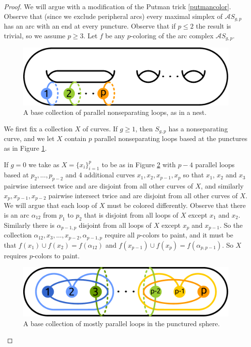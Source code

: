 \begin{proof}
  We will argue with a modification of the Putman trick \ref{putmancolor}.
  Observe that (since we exclude peripheral arcs)
  every maximal simplex of $\mathcal A S_{g,p}$
  has an arc with an end at every puncture.
  Observe that if $p \leq 2$ the result is trivial,
  so we assume $p \geq 3$.
  Let $f$ be any $p$-coloring of the
  arc complex $\mathcal A S_{g,p}$.

  \begin{figure}
    \includegraphics[width=.6\textwidth]{figures/pcolorgenus.pdf}
    \caption{A base collection of parallel nonseparating loops, as in a nest.}
    \label{fig:pcolorg}
  \end{figure}

  We first fix a collection $X$ of curves.
  If $g\geq1$, then $S_{g,p}$ has a nonseparating curve,
  and we let $X$ contain $p$ parallel nonseparating loops based at the punctures
  as in Figure \ref{fig:pcolorg}.


  If $g=0$ we take as $X=\{x_i\}_{i=1}^p$ to be as in Figure \ref{fig:pcolors}
  with $p-4$ parallel loops based at $p_2,\ldots,p_{p-2}$
  and 4 additional curves $x_1,x_2,x_{p-1},x_p$
  so that $x_1$, $x_2$ and $x_3$ pairwise intersect twice
  and are disjoint from all other curves of $X$,
  and similarly $x_p,x_{p-1},x_{p-2}$ pairwise intersect twice
  and are disjoint from all other curves of $X$.
  We will argue that each loop of $X$ must be colored differently.
  Observe that there is an arc
  $\alpha_{12}$
  from $p_1$ to $p_2$
  that is disjoint from all loops of $X$ except $x_1$ and $x_2$.
  Similarly
  there is  $\alpha_{p-1,p}$
  disjoint from all loops of $X$ except $x_p$ and $x_{p-1}$.
  So the collection $\alpha_{12},x_3,\ldots,x_{p-2},\alpha_{p-1,p}$
  require all $p$-colors to paint,
  and it must be that $f(x_1)\cup f(x_2) = f(\alpha_{12})$
  and $f(x_{p-1})\cup f(x_p) = f(\alpha_{p,p-1})$.
  So $X$ requires $p$-colors to paint.

  \begin{figure}
    \includegraphics[width=.6\textwidth]{figures/pcolorspher.pdf}
    \caption{A base collection of mostly parallel loops in the punctured sphere.}
    \label{fig:pcolors}
  \end{figure}



\end{proof}
